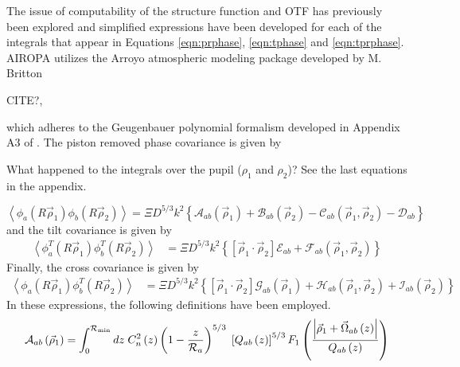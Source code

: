 The issue of computability of the structure function and OTF has previously been 
explored \cite{Tyler:1994} and simplified 
expressions have been developed for each of the integrals that appear in Equations
\ref{eqn:prphase}, \ref{eqn:tphase} and \ref{eqn:tprphase}.  
AIROPA utilizes the Arroyo atmospheric modeling package developed by M. Britton
\begin{notes}
CITE?,
\end{notes}
which adheres to the Geugenbauer polynomial formalism developed in 
Appendix A3 of \cite{Tyler:1994}. The piston
removed phase covariance is given by
\begin{notes}
What happened to the integrals over the pupil ($\rho_1$ and $\rho_2$)? See the 
last equations in the appendix.
\end{notes}
\begin{equation}\label{phasecovariance}
\left\langle \phi_{a}\left(R\vec{\rho}_{1}\right)  \phi_{b}\left(R\vec{\rho}_{2}\right)\right\rangle = 
\Xi D^{5/3} k^{2} \left\{
\mathcal{A}_{ab}\left(\vec{\rho}_{1}\right) + 
\mathcal{B}_{ab}\left(\vec{\rho}_{2}\right) - 
\mathcal{C}_{ab}\left(\vec{\rho}_{1},\vec{\rho}_{2}\right) - 
\mathcal{D}_{ab}\right\}
\end{equation}
and the tilt covariance is given by
\begin{equation}\label{tiltcovariance}
\begin{split}
\left\langle \phi^{T}_{a}\left(R\vec{\rho}_{1}\right)  \phi^{T}_{b}\left(R\vec{\rho}_{2}\right)\right\rangle & = 
\Xi D^{5/3} k^{2} \left\{
\left[\vec{\rho}_{1} \cdot \vec{\rho}_{2} \right] \mathcal{E}_{ab} + 
\mathcal{F}_{ab}\left(\vec{\rho}_{1}, \vec{\rho}_{2}\right)
\right\} 
\end{split}
\end{equation}
Finally, the cross covariance is given by
\begin{equation}\label{crosscovariance}
\begin{split}
\left\langle \phi_{a}\left(R\vec{\rho}_{1}\right)  \phi^{T}_{b}\left(R\vec{\rho}_{2}\right)\right\rangle & = 
\Xi D^{5/3} k^{2} \left\{
\left[\vec{\rho}_{1} \cdot \vec{\rho}_{2} \right] \mathcal{G}_{ab}\left(\vec{\rho}_{1}\right) + 
\mathcal{H}_{ab}\left(\vec{\rho}_{1}, \vec{\rho}_{2}\right) + 
\mathcal{I}_{ab}\left(\vec{\rho}_{2}\right)
\right\} 
\end{split}
\end{equation}
In these expressions, the following definitions have been employed.
\begin{equation}\label{caliph_A}
\mathcal{A}_{ab}\left(\vec{\rho}_{1}\right) = 
\int_{0}^{\mathcal{R}_{\rm min}} dz \; C_{n}^{2}\left(z\right) \left( 1 - \frac{z}{\mathcal{R}_{a}}\right)^{5/3}\; 
\left[Q_{ab}\left(z\right)\right]^{5/3} 
F_{1}\left(\frac{\left\vert\vec{\rho}_{1} + \vec{\Omega}_{ab}\left(z\right)\right\vert}{Q_{ab}\left(z\right)}\right)
\end{equation}

